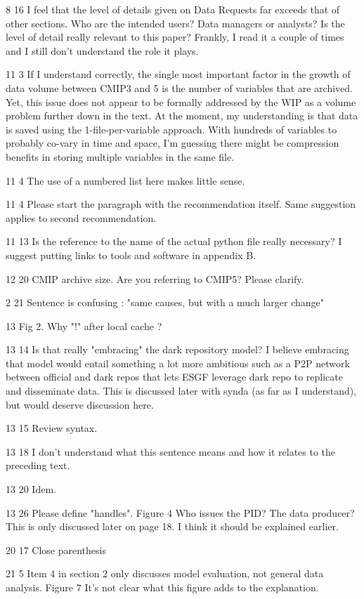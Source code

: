 \documentclass[gmd,manuscript]{copernicus}
\begin{document}
8 16 I feel that the level of details given on Data Requests far
exceeds that of other sections. Who are the intended users? Data
managers or analysts? Is the level of detail really relevant to this
paper? Frankly, I read it a couple of times and I still don’t
understand the role it plays.

11 3 If I understand correctly, the single most important factor in
the growth of data volume between CMIP3 and 5 is the number of
variables that are archived. Yet, this issue does not appear to be
formally addressed by the WIP as a volume problem further down in the
text. At the moment, my understanding is that data is saved using the
1-file-per-variable approach. With hundreds of variables to probably
co-vary in time and space, I’m guessing there might be compression
benefits in storing multiple variables in the same file.

11 4 The use of a numbered list here makes little sense.

11 4 Please start the paragraph with the recommendation itself. Same
suggestion applies to second recommendation.

11 13 Is the reference to the name of the actual python file really
necessary? I suggest putting links to tools and software in appendix
B.

12 20 CMIP archive size. Are you referring to CMIP5? Please clarify.

2 21 Sentence is confusing : "same causes, but with a much larger
change"

13 Fig 2. Why "!" after local cache ?

13 14 Is that really "embracing" the dark repository model? I believe
embracing that model would entail something a lot more ambitious such
as a P2P network between official and dark repos that lets ESGF
leverage dark repo to replicate and disseminate data. This is
discussed later with synda (as far as I understand), but would deserve
discussion here.

13 15 Review syntax.

13 18 I don’t understand what this sentence means and how it relates
to the preceding text.

13 20 Idem.

13 26 Please define "handles". Figure 4 Who issues the PID? The data
producer? This is only discussed later on page 18. I think it should
be explained earlier.

20 17 Close parenthesis

21 5 Item 4 in section 2 only discusses model evaluation, not general
data analysis. Figure 7 It’s not clear what this figure adds to the
explanation.
\end{document}
